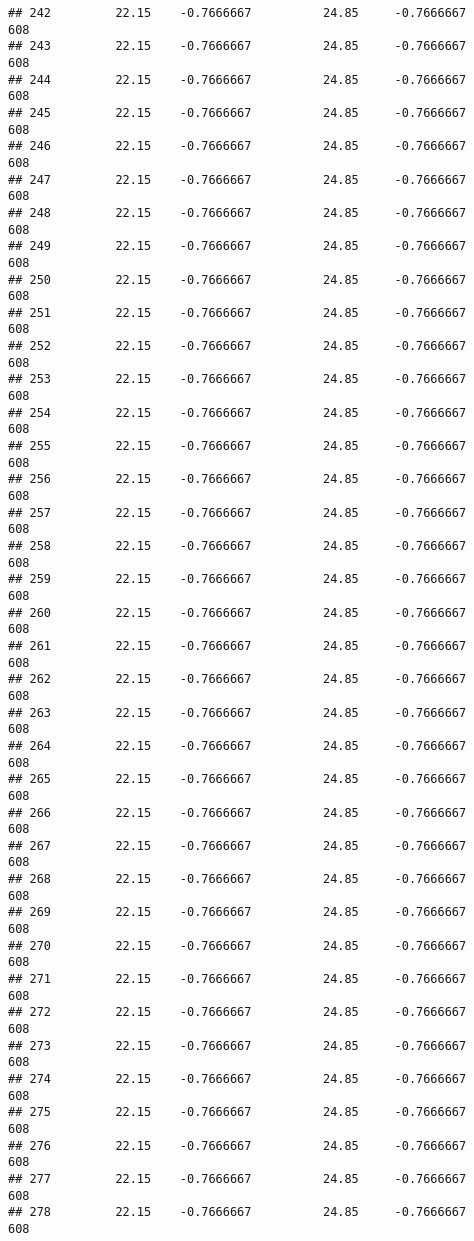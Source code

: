 \documentclass[]{article}
\begin{document}
\begin{verbatim}
## 242         22.15    -0.7666667          24.85     -0.7666667    608
## 243         22.15    -0.7666667          24.85     -0.7666667    608
## 244         22.15    -0.7666667          24.85     -0.7666667    608
## 245         22.15    -0.7666667          24.85     -0.7666667    608
## 246         22.15    -0.7666667          24.85     -0.7666667    608
## 247         22.15    -0.7666667          24.85     -0.7666667    608
## 248         22.15    -0.7666667          24.85     -0.7666667    608
## 249         22.15    -0.7666667          24.85     -0.7666667    608
## 250         22.15    -0.7666667          24.85     -0.7666667    608
## 251         22.15    -0.7666667          24.85     -0.7666667    608
## 252         22.15    -0.7666667          24.85     -0.7666667    608
## 253         22.15    -0.7666667          24.85     -0.7666667    608
## 254         22.15    -0.7666667          24.85     -0.7666667    608
## 255         22.15    -0.7666667          24.85     -0.7666667    608
## 256         22.15    -0.7666667          24.85     -0.7666667    608
## 257         22.15    -0.7666667          24.85     -0.7666667    608
## 258         22.15    -0.7666667          24.85     -0.7666667    608
## 259         22.15    -0.7666667          24.85     -0.7666667    608
## 260         22.15    -0.7666667          24.85     -0.7666667    608
## 261         22.15    -0.7666667          24.85     -0.7666667    608
## 262         22.15    -0.7666667          24.85     -0.7666667    608
## 263         22.15    -0.7666667          24.85     -0.7666667    608
## 264         22.15    -0.7666667          24.85     -0.7666667    608
## 265         22.15    -0.7666667          24.85     -0.7666667    608
## 266         22.15    -0.7666667          24.85     -0.7666667    608
## 267         22.15    -0.7666667          24.85     -0.7666667    608
## 268         22.15    -0.7666667          24.85     -0.7666667    608
## 269         22.15    -0.7666667          24.85     -0.7666667    608
## 270         22.15    -0.7666667          24.85     -0.7666667    608
## 271         22.15    -0.7666667          24.85     -0.7666667    608
## 272         22.15    -0.7666667          24.85     -0.7666667    608
## 273         22.15    -0.7666667          24.85     -0.7666667    608
## 274         22.15    -0.7666667          24.85     -0.7666667    608
## 275         22.15    -0.7666667          24.85     -0.7666667    608
## 276         22.15    -0.7666667          24.85     -0.7666667    608
## 277         22.15    -0.7666667          24.85     -0.7666667    608
## 278         22.15    -0.7666667          24.85     -0.7666667    608

\end{verbatim}
\end{document}
